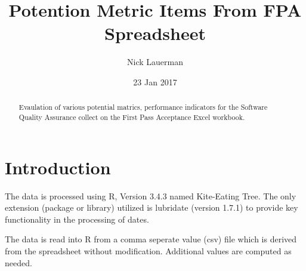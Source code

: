 \documentclass{article}
\title{Potention Metric Items From FPA Spreadsheet}
\author{Nick Lauerman}
\date{23 Jan 2017}
\begin{document}


\maketitle

\begin{abstract}
Evaulation of various potential matrics, performance indicators for the Software
Quality Assurance collect on the First Pass Acceptance Excel workbook.
\end{abstract}

\tableofcontents

\section{Introduction}
The data is processed using R, Version 3.4.3 named Kite-Eating Tree. The only
extension (package or library) utilized is lubridate (version 1.7.1) to provide
key functionality in the processing of dates.

The data is read into R from a comma seperate value (csv) file which is derived
from the spreadsheet without modification. Additional values are computed as needed.
\end{document}
